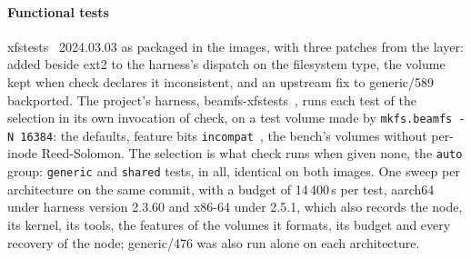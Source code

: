 \paragraph*{Functional tests}
xfstests~\cite{fstests} 2024.03.03 as packaged in the images, with three
patches from the layer: \bfs added beside ext2 to the harness's
dispatch on the filesystem type, the volume kept when check declares it
inconsistent, and an upstream fix to generic/589 backported. The
project's harness, beamfs-xfstests~\cite{bx}, runs each test of the
selection in its own invocation of check, on a test volume made by
\texttt{mkfs.beamfs -N 16384}: the \bfs defaults, feature bits
\texttt{incompat}~\featXfstests, the bench's volumes without per-inode
Reed-Solomon. The selection is what check runs when given none, the
\texttt{auto} group: \xfsGenericAuto{} \texttt{generic} and
\xfsSharedAuto{} \texttt{shared} tests, \xfsTotal{} in all, identical on
both images. One sweep per architecture on the same commit, with a
budget of 14\,400\,s per test, aarch64 under harness version 2.3.60 and
x86-64 under 2.5.1, which also records the node, its kernel, its tools,
the features of the volumes it formats, its budget and every recovery
of the node; generic/476 was also run alone on each architecture.
